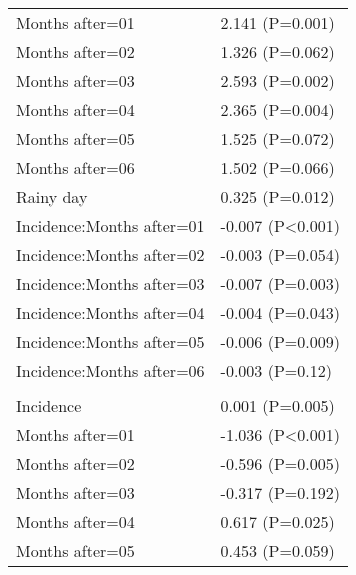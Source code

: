 \documentclass[]{article}
\begin{document}
\begin{longtable}[t]{ll}
\hspace{1em}Months after=01 & 2.141 (P=0.001)\\
\hspace{1em}Months after=02 & 1.326 (P=0.062)\\
\hspace{1em}Months after=03 & 2.593 (P=0.002)\\
\hspace{1em}Months after=04 & 2.365 (P=0.004)\\
\hspace{1em}Months after=05 & 1.525 (P=0.072)\\
\hspace{1em}Months after=06 & 1.502 (P=0.066)\\
\hspace{1em}Rainy day & 0.325 (P=0.012)\\
\hspace{1em}Incidence:Months after=01 & -0.007 (P<0.001)\\
\hspace{1em}Incidence:Months after=02 & -0.003 (P=0.054)\\
\hspace{1em}Incidence:Months after=03 & -0.007 (P=0.003)\\
\hspace{1em}Incidence:Months after=04 & -0.004 (P=0.043)\\
\hspace{1em}Incidence:Months after=05 & -0.006 (P=0.009)\\
\hspace{1em}Incidence:Months after=06 & -0.003 (P=0.12)\\
\addlinespace[1.5em]
\multicolumn{2}{l}{\textbf{Temporary field worker}}\\
\hspace{1em}Incidence & 0.001 (P=0.005)\\
\hspace{1em}Months after=01 & -1.036 (P<0.001)\\
\hspace{1em}Months after=02 & -0.596 (P=0.005)\\
\hspace{1em}Months after=03 & -0.317 (P=0.192)\\
\hspace{1em}Months after=04 & 0.617 (P=0.025)\\
\hspace{1em}Months after=05 & 0.453 (P=0.059)\\

\end{longtable}
\end{document}
